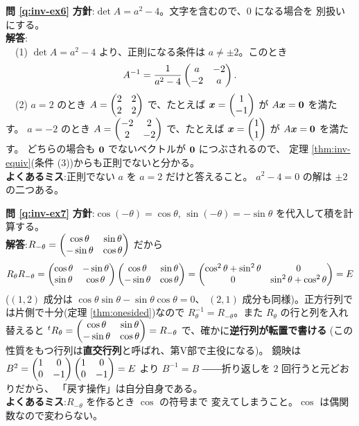 \bigskip
\noindent\textbf{問 \ref{q:inv-ex6}}\quad
\textbf{方針}:$\det A = a^2 - 4$。文字を含むので、$0$ になる場合を
別扱いにする。\\
\textbf{解答}:\\
　(1) $\det A = a^2 - 4$ より、正則になる条件は
$a \neq \pm 2$。このとき
\[
A^{-1} = \frac{1}{a^2 - 4}\begin{pmatrix}a & -2 \\ -2 & a\end{pmatrix}.
\]
　(2) $a = 2$ のとき $A = \begin{pmatrix}2 & 2 \\ 2 & 2\end{pmatrix}$ で、たとえば
$\bm{x} = \begin{pmatrix}1 \\ -1\end{pmatrix}$ が $A\bm{x} = \bm{0}$ を満たす。
$a = -2$ のとき $A = \begin{pmatrix}-2 & 2 \\ 2 & -2\end{pmatrix}$ で、たとえば
$\bm{x} = \begin{pmatrix}1 \\ 1\end{pmatrix}$ が $A\bm{x} = \bm{0}$ を満たす。
どちらの場合も $\bm{0}$ でないベクトルが $\bm{0}$ につぶされるので、
定理 \ref{thm:inv-equiv}(条件 (3))からも正則でないと分かる。\\
\textbf{よくあるミス}:正則でない $a$ を $a = 2$ だけと答えること。
$a^2 - 4 = 0$ の解は $\pm 2$ の二つある。

\bigskip
\noindent\textbf{問 \ref{q:inv-ex7}}\quad
\textbf{方針}:$\cos(-\theta) = \cos\theta$, $\sin(-\theta) = -\sin\theta$
を代入して積を計算する。\\
\textbf{解答}:$R_{-\theta} = \begin{pmatrix}\cos\theta & \sin\theta \\
-\sin\theta & \cos\theta\end{pmatrix}$ だから
\[
R_\theta R_{-\theta}
= \begin{pmatrix}\cos\theta & -\sin\theta \\ \sin\theta & \cos\theta\end{pmatrix}
\begin{pmatrix}\cos\theta & \sin\theta \\ -\sin\theta & \cos\theta\end{pmatrix}
= \begin{pmatrix}\cos^2\theta + \sin^2\theta & 0 \\ 0 & \sin^2\theta + \cos^2\theta\end{pmatrix}
= E
\]
($(1,2)$ 成分は $\cos\theta\sin\theta - \sin\theta\cos\theta = 0$、
$(2,1)$ 成分も同様)。正方行列では片側で十分(定理 \ref{thm:onesided})なので
$R_\theta^{-1} = R_{-\theta}$。また $R_\theta$ の行と列を入れ替えると
${}^t R_\theta = \begin{pmatrix}\cos\theta & \sin\theta \\ -\sin\theta & \cos\theta\end{pmatrix}
= R_{-\theta}$ で、確かに\textbf{逆行列が転置で書ける}
(この性質をもつ行列は\textbf{直交行列}と呼ばれ、第V部で主役になる)。
鏡映は $B^2 = \begin{pmatrix}1 & 0 \\ 0 & -1\end{pmatrix}\begin{pmatrix}1 & 0 \\ 0 & -1\end{pmatrix} = E$ より
$B^{-1} = B$ ――折り返しを $2$ 回行うと元どおりだから、
「戻す操作」は自分自身である。\\
\textbf{よくあるミス}:$R_{-\theta}$ を作るとき $\cos$ の符号まで
変えてしまうこと。$\cos$ は偶関数なので変わらない。

